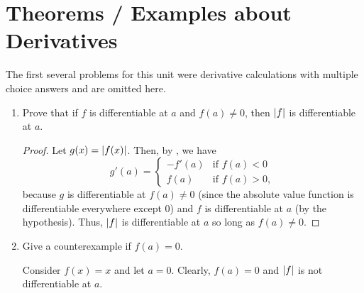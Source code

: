 \section{Theorems / Examples about Derivatives}

\setcounter{problem}{6}

\begin{callout}
  The first several problems for this unit were derivative calculations with multiple choice
  answers and are omitted here.
\end{callout}

\begin{problem}
  \begin{enumerate}[label=(\alph*)]
    \item Prove that if $f$ is differentiable at $a$ and $f(a) \neq 0$, then $\left\lvert f \right\rvert$
      is differentiable at $a$.

      \begin{proof}
        Let $g(x) = \left\lvert f(x) \right\rvert$. Then, by , we have
        \[
          g'(a) = 
          \begin{cases}
            -f'(a) & \text{if } f(a) < 0 \\
            f(a) & \text{if } f(a) > 0,
          \end{cases}
        \]
        because $g$ is differentiable at $f(a) \neq 0$ (since the absolute
        value function is differentiable everywhere except $0$) and $f$ is
        differentiable at $a$ (by the hypothesis). Thus, $\left\lvert f \right\rvert$ is
        differentiable at $a$ so long as $f(a) \neq 0$.
      \end{proof}

    \item Give a counterexample if $f(a) = 0$.
      \vspace{\baselineskip}

      Consider $f(x) = x$ and let $a = 0$. Clearly, $f(a) = 0$ and $\left\lvert f \right\rvert$ is not differentiable at $a$.
  \end{enumerate}
\end{problem}


